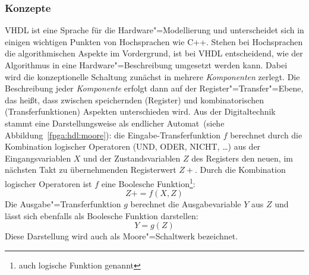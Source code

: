 \subsubsection{Konzepte}

VHDL ist eine Sprache für die Hardware"=Modellierung und unterscheidet sich in
einigen wichtigen Punkten von Hochsprachen wie C++. Stehen bei Hochsprachen
die algorithmischen Aspekte im Vordergrund, ist bei VHDL entscheidend, wie der
Algorithmus in eine Hardware"=Beschreibung umgesetzt werden kann. Dabei wird die
konzeptionelle Schaltung zunächst in mehrere \textit{Komponenten} zerlegt. Die
Beschreibung jeder \textit{Komponente} erfolgt dann auf der
Register"=Transfer"=Ebene, das heißt, dass zwischen speichernden (Register) und
kombinatorischen (Transferfunktionen) Aspekten unterschieden wird. Aus der
Digitaltechnik stammt eine Darstellungsweise als \glqq endlicher Automat\grqq\
(siehe Abbildung~\ref{fpga:hdl:moore}): die Eingabe-Transferfunktion $f$
berechnet durch die Kombination logischer Operatoren (UND, ODER, NICHT, \ldots)
aus der Eingangsvariablen $X$ und der Zustandsvariablen $Z$ des Registers den
neuen, im nächsten Takt zu übernehmenden Registerwert $Z+$. Durch die
Kombination logischer Operatoren ist $f$ eine Boolesche Funktion\footnote{auch
logische Funktion genannt}:
%
\[
    Z+ = f(X, Z)
\]
%
Die Ausgabe"=Transferfunktion $g$ berechnet die Ausgabevariable $Y$ aus $Z$ und
lässt sich ebenfalls als Boolesche Funktion darstellen:
%
\[
    Y = g(Z)
\]
%
Diese Darstellung wird auch als Moore"=Schaltwerk bezeichnet.
\cite[vgl.][34--35]{kesel2013}
%
